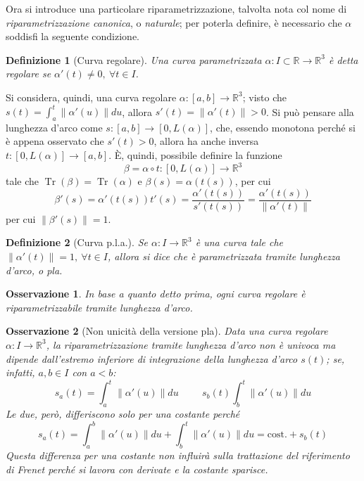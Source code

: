 \documentclass[12pt]{scrartcl}
\theoremstyle{style}
\newtheorem{definizione}{Definizione}[section]
\newtheorem{osservazione}{Osservazione}[section]
\numberwithin{equation}{subsection}
\begin{document}
\noindent Ora si introduce una particolare riparametrizzazione, talvolta nota col nome di \textit{riparametrizzazione canonica}, o \textit{naturale}; per poterla definire, \`e necessario che $\alpha $ soddisfi la seguente condizione.
\begin{definizione}
	[Curva regolare]
	Una curva parametrizzata $\alpha : I \subset \mathbb{R} \to \mathbb{R}^3$ \`e detta \textit{regolare} se $\alpha '(t) \neq 0, \ \forall t \in I$.
\end{definizione}
\noindent Si considera, quindi, una curva regolare $\alpha :[a,b] \to \mathbb{R}^3$; visto che $s(t) = \int_{a} ^t \left\lVert \alpha '(u) \right\rVert du$, allora $s'(t) = \left\lVert \alpha '(t) \right\rVert >0$.
Si pu\`o pensare alla lunghezza d'arco come $s : [a,b] \to [0, L(\alpha )]$, che, essendo monotona perch\'e si \`e appena osservato che $s'(t) > 0$, allora ha anche inversa $t : [0,L(\alpha )]\to [a,b]$.
\`E, quindi, possibile definire la funzione 
\begin{equation}
	\beta = \alpha \circ t : [0,L(\alpha )]\to \mathbb{R}^3
\end{equation}
tale che $\operatorname{Tr} (\beta )=\operatorname{Tr} (\alpha ) $ e $\beta (s) = \alpha (t(s))$, per cui
\[
\beta '(s) = \alpha '(t(s)) t'(s) = \frac{\alpha '(t(s))}{s'(t(s))} = \frac{\alpha '(t(s))}{\left\lVert \alpha '(t) \right\rVert }
\] 
per cui $\left\lVert \beta '(s) \right\rVert =1$.
\begin{definizione}
	[Curva p.l.a.]
	Se $\alpha :I\to\mathbb{R}^3$ \`e una curva tale che $\left\lVert \alpha '(t)\right\rVert = 1 , \ \forall t \in I$, allora si dice che \`e \textit{parametrizzata tramite lunghezza d'arco}, o pla.
\end{definizione}
\begin{osservazione}
In base a quanto detto prima, ogni curva regolare \`e \textit{riparametrizzabile tramite lunghezza d'arco}.
\end{osservazione}
\begin{osservazione}
	[Non unicit\`a della versione pla]
	Data una curva regolare $\alpha  : I \to \mathbb{R}^3$, la riparametrizzazione tramite lunghezza d'arco non \`e univoca ma dipende dall'estremo inferiore di integrazione della lunghezza d'arco $s(t)$; se, infatti, $a,b \in I$ con $a < b$:
	\[
	s_a (t) = \int_{a} ^t \left\lVert \alpha '(u) \right\rVert du \hspace{1cm}s_b (t) \int_{b} ^t \left\lVert \alpha '(u) \right\rVert du
	\] 
	Le due, per\`o, differiscono solo per una costante perch\'e
	\[
	s_a(t) = \int_{a} ^b \left\lVert \alpha '(u) \right\rVert du + \int_{b} ^t \left\lVert \alpha '(u) \right\rVert du = \text{cost.} + s_b(t)
	\] 
	Questa differenza per una costante non influir\`a sulla trattazione del riferimento di Frenet perch\'e si lavora con derivate e la costante sparisce.
\end{osservazione}
\end{document}
